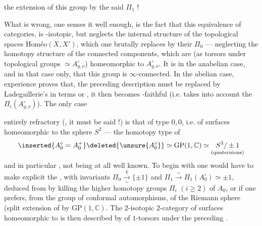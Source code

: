 the extension of this group by the said $\Pi_1$ !

What is wrong, one senses it well enough, is
the fact that this equivalence of categories,
is -isotopic, but neglects the
internal  structure of the topological spaces
 $\mathrm{Homéo}(X,X')$, which one
brutally replaces by their $\Pi_0$ --- neglecting
the homotopy structure of the connected
components, which are (as torsors
under topological groups $\simeq A_{g,\nu}^{\circ}$) homeomorphic
to $A_{g,\nu}^{\circ}$. It is  in the
anabelian case, and in that case only,
that this group is $\infty$-connected. In
the abelian case, experience proves that,
the preceding description must be replaced
by Ladegaillerie's in terms 
 or ,  it
then becomes  \unsure{$\infty$}-faithful (i.e. takes into account
the $\Pi_i(A_{g,\nu}^{\circ})$). The only case

entirely refractory (, it
must be said !) is that of type $0,0$, i.e.
of surfaces homeomorphic to the sphere $S^2$
--- the homotopy type of 
\[
\inserted{A_0^\circ=A_0^+}\deleted{\unsure{A_0^\circ}}
\simeq \mathrm{GP}(1,\mathbb C)\simeq
\underset{(\text{quaternions})}{S^3/\pm1}
\]
and in particular  , not being at
all well known. To begin with one would have
to  make explicit the
 , with invariants $\Pi_0\xrightarrow[\sim]{\chi}\{\pm1\}$ and
$\Pi_1\xrightarrow{\sim}\Pi_1(A_0^\circ)\simeq\pm1$, deduced from 
by killing the higher homotopy groups
$\Pi_i$ $(i\geq2)$ of $A_0$, or if one prefers,
from the group of conformal automorphisms,
of the Riemann sphere (split extension
of  by $\mathrm{GP}(1,\mathbb C)$.
The $2$-isotopic $2$-category
of surfaces homeomorphic to 
 is then described by  of
$1$-torsors under the preceding .

